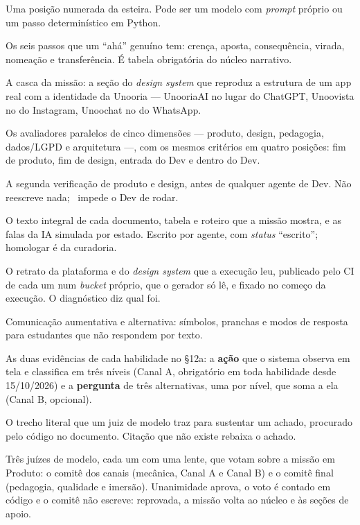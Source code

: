 \documentclass[11pt,a4paper]{article}
\newcommand{\bolinha}[1]{\tikz[baseline=-0.5ex]{\fill[#1] (0,0) circle (0.33em);}}
\newcommand{\statusVermelho}{\bolinha{sinalVermelho}}
\begin{document}
\begin{description}[leftmargin=3.5cm,style=sameline,font=\sffamily\bfseries\color{unNavy},itemsep=3pt]
  \item[Agente] Uma posição numerada da esteira. Pode ser um modelo com \emph{prompt} próprio ou um passo determinístico em Python.
  \item[Anatomia do ``ahá''] Os seis passos que um ``ahá'' genuíno tem: crença, aposta, consequência, virada, nomeação e transferência. É tabela obrigatória do núcleo narrativo.
  \item[Ambiente simulado] A casca da missão: a seção do \emph{design system} que reproduz a estrutura de um app real com a identidade da Unooria --- UnooriaAI no lugar do ChatGPT, Unoovista no do Instagram, Unoochat no do WhatsApp.
  \item[Banca] Os avaliadores paralelos de cinco dimensões --- produto, design, pedagogia, dados/LGPD e arquitetura ---, com os mesmos critérios em quatro posições: fim de produto, fim de design, entrada do Dev e dentro do Dev.
  \item[Banca de entrada] A segunda verificação de produto e design, antes de qualquer agente de Dev. Não reescreve nada; \statusVermelho\ impede o Dev de rodar.
  \item[Banco de conteúdo] O texto integral de cada documento, tabela e roteiro que a missão mostra, e as falas da IA simulada por estado. Escrito por agente, com \emph{status} ``escrito''; homologar é da curadoria.
  \item[Base da plataforma] O retrato da plataforma e do \emph{design system} que a execução leu, publicado pelo CI de cada um num \emph{bucket} próprio, que o gerador só lê, e fixado no começo da execução. O diagnóstico diz qual foi.
  \item[CAA] Comunicação aumentativa e alternativa: símbolos, pranchas e modos de resposta para estudantes que não respondem por texto.
  \item[Canal A, Canal B] As duas evidências de cada habilidade no \S12a: a \textbf{ação} que o sistema observa em tela e classifica em três níveis (Canal A, obrigatório em toda habilidade desde 15/10/2026) e a \textbf{pergunta} de três alternativas, uma por nível, que soma a ela (Canal B, opcional).
  \item[Citação conferida] O trecho literal que um juiz de modelo traz para sustentar um achado, procurado pelo código no documento. Citação que não existe rebaixa o achado.
  \item[Comitê pedagógico] Três juízes de modelo, cada um com uma lente, que votam sobre a missão em Produto: o comitê dos canais (mecânica, Canal A e Canal B) e o comitê final (pedagogia, qualidade e imersão). Unanimidade aprova, o voto é contado em código e o comitê não escreve: reprovada, a missão volta ao núcleo e às seções de apoio.

\end{description}
\end{document}
